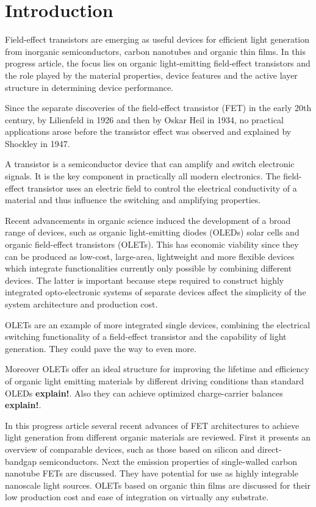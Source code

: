 \section{Introduction}
Field-effect transistors are emerging as useful devices for efficient light generation from inorganic semiconductors, carbon nanotubes and organic thin films. In this progress article, the focus lies on organic light-emitting field-effect transistors and the role played by the material properties, device features and the active layer structure in determining device performance.

Since the separate discoveries of the field-effect transistor (FET) in the early 20th century, by Lilienfeld in 1926 and then by Oskar Heil in 1934, no practical applications arose before the transistor effect was observed and explained by Shockley in 1947. %

A transistor is a semiconductor device that can amplify and switch electronic signals. It is the key component in practically all modern electronics. The field-effect transistor uses an electric field to control the electrical conductivity of a material and thus influence the switching and amplifying properties.

Recent advancements in organic science induced the development of a broad range of devices, such as organic light-emitting diodes (OLEDs) solar cells and organic field-effect transistors (OLETs). This has economic viability since they can be produced as low-cost, large-area, lightweight and more flexible devices which integrate functionalities currently only possible by combining different devices. The latter is important because steps required to construct highly integrated opto-electronic systems of separate devices affect the simplicity of the system architecture and production cost.

OLETs are an example of more integrated single devices, combining the electrical switching functionality of a field-effect transistor and the capability of light generation. They could pave the way to even more. 

Moreover OLETs offer an ideal structure for improving the lifetime and efficiency of organic light emitting materials by different driving conditions than standard OLEDs \textbf{explain!}. Also they can achieve optimized charge-carrier balances \textbf{explain!}.

In this progress article several recent advances of FET architectures to achieve light generation from different organic materials are reviewed. First it presents an overview of comparable devices, such as those based on silicon and direct-bandgap semiconductors. Next the emission properties of single-walled carbon nanotube FETs are discussed. They have potential for use as highly integrable nanoscale light sources. OLETs based on organic thin films are discussed for their low production cost and ease of integration on virtually any substrate. 
